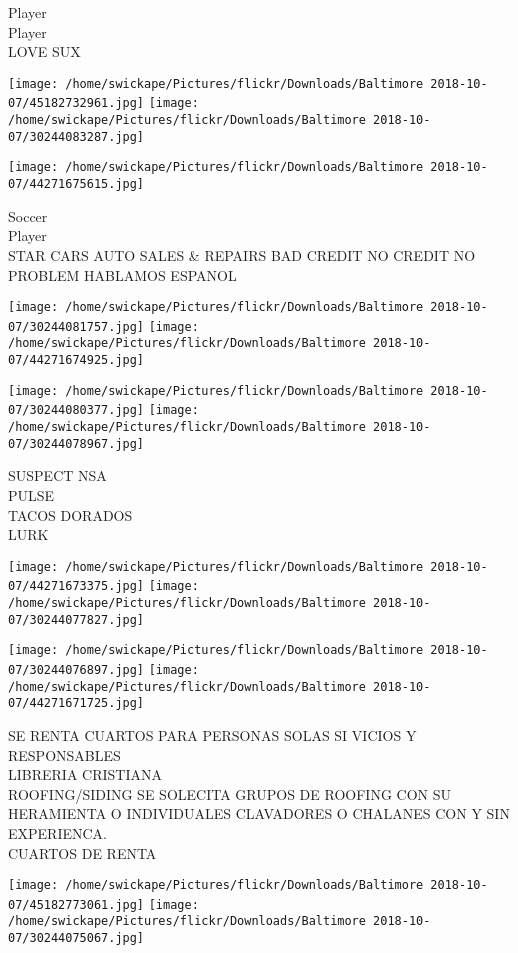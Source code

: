\documentclass[10pt,letterpaper]{article}
\begin{document}
Player\\
Player\\
LOVE SUX
\pagebreak

\texttt{[image: /home/swickape/Pictures/flickr/Downloads/Baltimore 2018-10-07/45182732961.jpg]}
\texttt{[image: /home/swickape/Pictures/flickr/Downloads/Baltimore 2018-10-07/30244083287.jpg]}

\vspace{0.25in}
\texttt{[image: /home/swickape/Pictures/flickr/Downloads/Baltimore 2018-10-07/44271675615.jpg]}

Soccer\\
Player\\
STAR CARS AUTO SALES \& REPAIRS BAD CREDIT NO CREDIT NO PROBLEM HABLAMOS ESPANOL
\pagebreak

\texttt{[image: /home/swickape/Pictures/flickr/Downloads/Baltimore 2018-10-07/30244081757.jpg]}
\texttt{[image: /home/swickape/Pictures/flickr/Downloads/Baltimore 2018-10-07/44271674925.jpg]}

\texttt{[image: /home/swickape/Pictures/flickr/Downloads/Baltimore 2018-10-07/30244080377.jpg]}
\texttt{[image: /home/swickape/Pictures/flickr/Downloads/Baltimore 2018-10-07/30244078967.jpg]}

SUSPECT NSA\\
PULSE\\
TACOS DORADOS\\
LURK
\pagebreak

\texttt{[image: /home/swickape/Pictures/flickr/Downloads/Baltimore 2018-10-07/44271673375.jpg]}
\texttt{[image: /home/swickape/Pictures/flickr/Downloads/Baltimore 2018-10-07/30244077827.jpg]}

\texttt{[image: /home/swickape/Pictures/flickr/Downloads/Baltimore 2018-10-07/30244076897.jpg]}
\texttt{[image: /home/swickape/Pictures/flickr/Downloads/Baltimore 2018-10-07/44271671725.jpg]}

SE RENTA CUARTOS PARA PERSONAS SOLAS SI VICIOS Y RESPONSABLES\\
LIBRERIA CRISTIANA\\
ROOFING/SIDING SE SOLECITA GRUPOS DE ROOFING CON SU HERAMIENTA O INDIVIDUALES CLAVADORES O CHALANES CON Y SIN EXPERIENCA.\\
CUARTOS DE RENTA
\pagebreak

\texttt{[image: /home/swickape/Pictures/flickr/Downloads/Baltimore 2018-10-07/45182773061.jpg]}
\texttt{[image: /home/swickape/Pictures/flickr/Downloads/Baltimore 2018-10-07/30244075067.jpg]}
\end{document}
